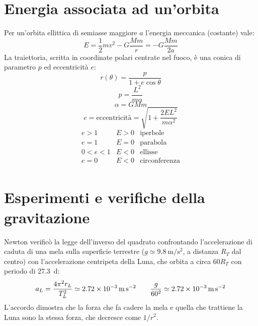 \section{Energia associata ad un'orbita}
Per un'orbita ellittica di semiasse maggiore $a$ l'energia meccanica (costante) vale:
\[E=\frac{1}{2}mv^2-G\frac{Mm}{r}=-G\frac{Mm}{2a}\]
La traiettoria, scritta in coordinate polari centrate nel fuoco, è una conica di parametro $p$ ed eccentricità $e$:
\[r(\theta)=\frac{p}{1+e\cos\theta}\]
\[p=\frac{L^2}{m\alpha}\]
\[\alpha=GMm\]
\[e=\text{eccentricità}=\sqrt{1+\frac{2EL^2}{m\alpha^2}}\]
\[\begin{array}{llc}
    e>1   & E>0 & \text{iperbole}      \\
    e=1   & E=0 & \text{parabola}      \\
    0<e<1 & E<0 & \text{ellisse}       \\
    e=0   & E<0 & \text{circonferenza} \\
  \end{array}\]

\section{Esperimenti e verifiche della gravitazione}
\begin{Es}
  Newton verificò la legge dell'inverso del quadrato confrontando l'accelerazione di caduta di una mela sulla superficie terrestre ($g\simeq\SI{9.8}{\meter\per\second\squared}$, a distanza $R_T$ dal centro) con l'accelerazione centripeta della Luna, che orbita a circa $60R_T$ con periodo di \SI{27.3}{\day}:
  \[
    a_L=\frac{4\pi^2 r_L}{T_L^2}\simeq\SI{2.72E-3}{\meter\per\second\squared}\qquad \frac{g}{60^2}\simeq\SI{2.72E-3}{\meter\per\second\squared}
  \]
  L'accordo dimostra che la forza che fa cadere la mela e quella che trattiene la Luna sono la stessa forza, che decresce come $1/r^2$.
\end{Es}

